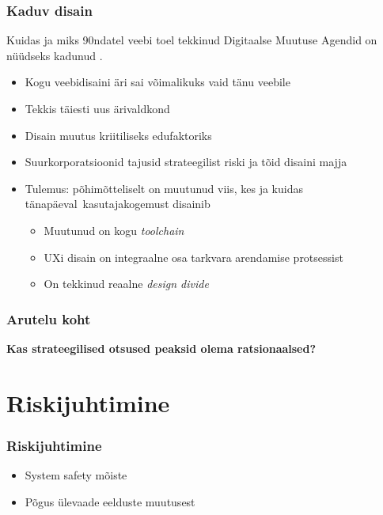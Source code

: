 \begin{frame}[fragile]
  \frametitle{Kaduv disain}
  Kuidas ja miks 90ndatel veebi toel tekkinud Digitaalse Muutuse Agendid on nüüdseks kadunud \citep{design}. 
	\begin{itemize}
		\item Kogu veebidisaini äri sai võimalikuks vaid tänu veebile
		\item Tekkis täiesti uus ärivaldkond
		\item Disain muutus kriitiliseks edufaktoriks
		\item Suurkorporatsioonid tajusid strateegilist riski ja tõid disaini majja
		\item Tulemus: põhimõtteliselt on muutunud viis, kes ja kuidas tänapäeval kasutajakogemust disainib
		\begin{itemize}
			\item Muutunud on kogu \emph{toolchain}
			\item UXi disain on integraalne osa tarkvara arendamise protsessist
			\item On tekkinud reaalne \emph{design divide}
		\end{itemize}		
	\end{itemize}
\end{frame}

\begin{frame}[fragile]
  \frametitle{Arutelu koht}
		\begin{center}
			\textbf{Kas strateegilised otsused peaksid olema ratsionaalsed?}
		\end{center}
\end{frame}

\section{Riskijuhtimine}
\begin{frame}[fragile]
  \frametitle{Riskijuhtimine}
	\begin{itemize}
		\item System safety mõiste
		\item Põgus ülevaade eelduste muutusest
	\end{itemize}
\end{frame}

